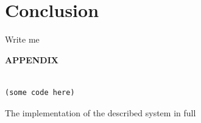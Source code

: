 \documentclass[oribibl]{llncs}
\begin{document}
\section{Conclusion}
\label{sec:conclusion}
Write me 

\newpage
\nocite{*}



\newpage
    \begin{center}
      {\bf APPENDIX}
    \end{center}
\label{sec:appendix}

\begin{listing}[]%
\begin{verbatim}

(some code here)

\end{verbatim}
\caption{The implementation of the described system in full}
\label{lst:entire-implementation}
\end{listing}
\end{document}
